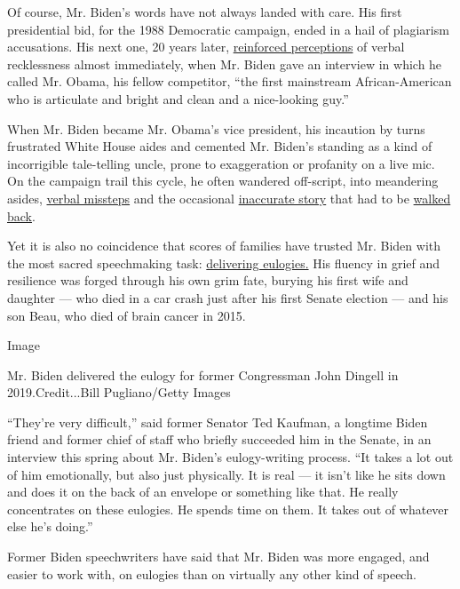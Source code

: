 Of course, Mr. Biden's words have not always landed with care. His first
presidential bid, for the 1988 Democratic campaign, ended in a hail of
plagiarism accusations. His next one, 20 years later,
\href{https://www.nytimes3xbfgragh.onion/2007/02/01/us/politics/01biden.html}{reinforced
perceptions} of verbal recklessness almost immediately, when Mr. Biden
gave an interview in which he called Mr. Obama, his fellow competitor,
``the first mainstream African-American who is articulate and bright and
clean and a nice-looking guy.''

When Mr. Biden became Mr. Obama's vice president, his incaution by turns
frustrated White House aides and cemented Mr. Biden's standing as a kind
of incorrigible tale-telling uncle, prone to exaggeration or profanity
on a live mic. On the campaign trail this cycle, he often wandered
off-script, into meandering asides,
\href{https://www.nytimes3xbfgragh.onion/2019/10/30/us/politics/joe-biden-debate-gaffes.html}{verbal
missteps} and the occasional
\href{https://www.nytimes3xbfgragh.onion/2020/02/21/us/politics/biden-south-africa-arrest-mandela.html}{inaccurate
story} that had to be
\href{https://www.nytimes3xbfgragh.onion/2020/02/26/us/politics/joe-biden-arrest-mandela.html}{walked
back}.

Yet it is also no coincidence that scores of families have trusted Mr.
Biden with the most sacred speechmaking task:
\href{https://www.nytimes3xbfgragh.onion/2020/06/11/us/politics/joe-biden-funeral-speech.html}{delivering
eulogies.} His fluency in grief and resilience was forged through his
own grim fate, burying his first wife and daughter --- who died in a car
crash just after his first Senate election --- and his son Beau, who
died of brain cancer in 2015.

Image

Mr. Biden delivered the eulogy for former Congressman John Dingell in
2019.Credit...Bill Pugliano/Getty Images

``They're very difficult,'' said former Senator Ted Kaufman, a longtime
Biden friend and former chief of staff who briefly succeeded him in the
Senate, in an interview this spring about Mr. Biden's eulogy-writing
process. ``It takes a lot out of him emotionally, but also just
physically. It is real --- it isn't like he sits down and does it on the
back of an envelope or something like that. He really concentrates on
these eulogies. He spends time on them. It takes out of whatever else
he's doing.''

Former Biden speechwriters have said that Mr. Biden was more engaged,
and easier to work with, on eulogies than on virtually any other kind of
speech.

